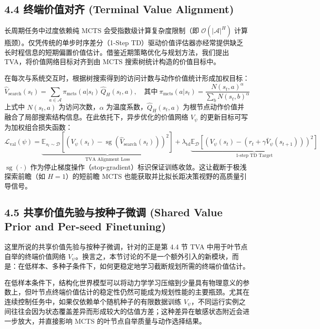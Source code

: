 \documentclass[UTF8]{ctexart}
\begin{document}
\hypertarget{sub-tva}{%
\subsection{4.4 终端价值对齐 (Terminal Value Alignment)}\label{sub-tva}}

长周期任务中过度依赖纯 MCTS 会受指数级计算复杂度限制（即 $\mathcal{O}(|\mathcal{A}|^H)$ 计算瓶颈）。仅凭传统的单步时序差分（1-Step TD）驱动价值评估器亦经常提供缺乏长时程信息的短期偏置价值估计。借鉴近期策略优化与规划方法，我们提出 TVA，将价值网络目标对齐到由 MCTS 搜索树统计构造的价值目标中。

在每次与系统交互时，根据树搜索得到的访问计数与动作价值统计形成加权目标：
\[
\hat V_{\text{search}}(s_t)= \sum_{a \in \mathcal{A}} \pi_{\text{mcts}}(a|s_t)\,\hat Q_H(s_t,a),
\quad \text{其中}\ \pi_{\text{mcts}}(a|s_t)=\frac{N(s_t,a)^\alpha}{\sum_b N(s_t,b)^\alpha}
\]
上式中 $N(s_t,a)$ 为访问次数，$\alpha$ 为温度系数，$\hat Q_H(s_t,a)$ 为根节点动作价值并融合了局部搜索结构信息。在此依托下，异步优化的价值网络 $V_\psi$ 的更新目标可写为加权组合损失函数：
\[
\mathcal L_{\text{val}}(\psi)= \underbrace{ \mathbb E_{s_t\sim\mathcal D} \left[ \left( V_\psi(s_t)-\operatorname{sg}\!\left(\hat V_{\text{search}}(s_t)\right) \right)^2 \right]}_{\text{TVA Alignment Loss}} + \lambda_{\text{td}} \underbrace{ \mathbb E_{\mathcal D} \left[ \left( V_\psi(s_t)-\left(r_t+\gamma \bar V_\psi(s_{t+1})\right) \right)^2 \right]}_{\text{1-step TD Target}}
\]
$\operatorname{sg}(\cdot)$ 作为停止梯度操作（stop-gradient）标识保证训练收敛。这让截断于极浅探索前瞻（如 $H=1$）的短前瞻 MCTS 也能获取并比拟长距决策视野的高质量引导信号。

\hypertarget{sub-inference-prior}{%
\subsection{4.5 共享价值先验与按种子微调 (Shared Value Prior and Per-seed Finetuning)}\label{sub-inference-prior}}

这里所说的共享价值先验与按种子微调，针对的正是第 4.4 节 TVA 中用于叶节点自举的终端价值网络 \(V_\psi\)。换言之，本节讨论的不是一个额外引入的新模块，而是：在低样本、多种子条件下，如何更稳定地学习截断规划所需的终端价值估计。

在低样本条件下，结构化世界模型可以将动力学学习压缩到少量具有物理意义的参数上，但叶节点终端价值估计的稳定性仍然可能成为规划性能的主要瓶颈。尤其在连续控制任务中，如果仅依赖单个随机种子的有限数据训练 \(V_\psi\)，不同运行实例之间往往会因为状态覆盖差异而形成较大的估值方差；这种差异在敏感状态附近会进一步放大，并直接影响 MCTS 的叶节点自举质量与动作选择结果。
\end{document}

